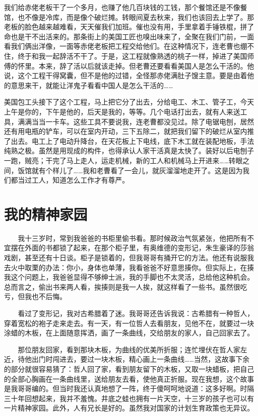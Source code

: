 我们给赤佬老板干了一个多月，也赚了他几百块钱的工钱，那个餐馆还是不像餐馆，也不像是冷库，而是像个破烂摊。转眼间夏去秋来，我们也该回去上学了。那老板的脸色越来越难看，天天催我们加班。催也没有用，手里拿着手锤铁棍，拼了命也是干不出活来的。那条街上的美国工匠也嗅出味来了，全聚在我们门前，一面看我们俩出洋像，一面等赤佬老板把工程交给他们。在这种情况下，连老曹也绷不住，终于和我一起辞活不干了。于是，这工程就像熟透的桃子一样，掉进了美国师傅的怀里。本来，辞了活以后就该走掉。但老曹还要看看美国人是怎么干活的。他说，这个工程干得窝囊，但不是他的过错，全怪那赤佬满肚子馊主意。要是由着他的意思来干，就能让洋鬼子看看中国人是怎么干活的…… 

美国包工头接下了这个工程，马上把它分了出去，分给电工、木工、管子工，今天上午是你的，下午是他的，后天是我的，等等。几个电话打出去，就有人来送工具，满满当当一卡车。这些工具不要说我，连老曹都没见过。除了电锯电刨，居然还有用电瓶的铲车，可以在室内开动，三下五除二，就把我们留下的破烂从室内推了出去。电工上了电动升降台，在天花板上下电线，底下木工就在装配地板，手法纯熟之极。虽然是用现成的构件，也得承认人家干活真是太快了。装好以后电刨子一跑，贼亮；干完了马上走人，运走机械，新的工人和机械马上开进来……转眼之间，饭馆就有个样儿了……我和老曹看了一会儿，就灰溜溜地走开了。这是因为我们都当过工人，知道怎么工作才有尊严。

\chapter{我的精神家园}

　　我十三岁时，常到我爸爸的书柜里偷书看。那时候政治气氛紧张，他把所有不宜摆在外面的书都锁了起来，在那个柜子里，有奥维德的变形记，朱生豪译的莎翁戏剧，甚至还有十日谈。柜子是锁着的，但我哥哥有捅开它的方法。他还有说服我去火中取栗的办法：你小，身体也单薄，我看爸爸不好意思揍你。但实际上，在揍我这个问题上，我爸爸显得不够绅士派，我的手脚也不太灵活，总给他这种机会。总而言之，偷出书来两人看，挨揍则是我一人挨，就这样看了一些书。虽然很吃亏，但我也不后悔。 

　　看过了变形记，我对古希腊着了迷。我哥哥还告诉我说：古希腊有一种哲人，穿着宽松的袍子走来走去。有一天，有一位哲人去看朋友，见他不在，就要过一块涂蜡的木板，在上面随意挥洒，画了一条曲线，交给朋友的家人，自己回家去了。 

　　那位朋友回家，看到那块木板，为曲线的优美所折服；连忙埋伏在哲人家左近，待他出门时闯进去，要过一块木板，精心画上一条曲线……当然，这故事下余的部分就很容易猜了：哲人回了家，看到朋友留下的木板，又取一块蜡板，把自己的全部心胸画在一条曲线里，送给朋友去看，使他真正折服。现在我想，这个故事是我哥哥编的。但当时我还认真地想了一阵，终于傻呵呵地说道：这多好啊。时隔三十年回想起来，我并不羞愧。井底之蛙也拥有一片天空，十三岁的孩子也可以有一片精神家园。此外，人有兄长是好的。虽然我对国家的计划生育政策也无异议。 

